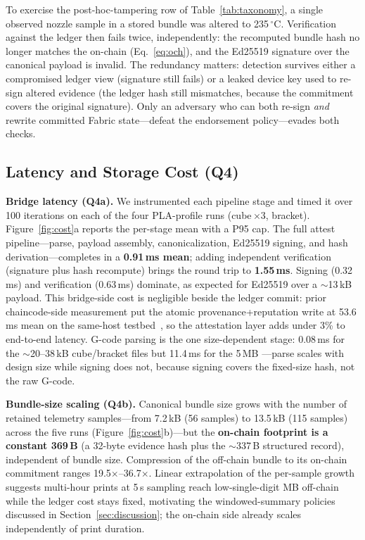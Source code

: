 To exercise the post-hoc-tampering row of Table~\ref{tab:taxonomy}, a
single observed nozzle sample in a stored bundle was altered to
235\,$^{\circ}$C.  Verification against the ledger then fails twice,
independently: the recomputed bundle hash no longer matches the on-chain
 (Eq.~\eqref{eq:och}), and the Ed25519 signature
over the canonical payload is invalid.  The redundancy matters: detection
survives either a compromised ledger view (signature still fails) or a
leaked device key used to re-sign altered evidence (the ledger hash still
mismatches, because the commitment covers the original signature).  Only
an adversary who can both re-sign \emph{and} rewrite committed Fabric
state---defeat the endorsement policy---evades both checks.

\subsection{Latency and Storage Cost (Q4)}
\label{sec:eval_cost}

\textbf{Bridge latency (Q4a).}  We instrumented each pipeline stage and
timed it over 100 iterations on each of the four PLA-profile runs
(cube\,$\times$3, bracket).  Figure~\ref{fig:cost}a reports the per-stage
mean with a P95 cap.  The full attest pipeline---parse, payload assembly,
canonicalization, Ed25519 signing, and hash derivation---completes in a
\textbf{0.91\,ms mean}; adding independent verification (signature plus
hash recompute) brings the round trip to \textbf{1.55\,ms}.  Signing
(0.32\,ms) and verification (0.63\,ms) dominate, as expected for Ed25519
over a $\sim$13\,kB payload.  This bridge-side cost is negligible beside
the ledger commit: prior chaincode-side measurement put the atomic
provenance+reputation write at 53.6\,ms mean on the same-host
testbed~\cite{anonymous2026unified}, so the attestation layer adds under
3\% to end-to-end latency.  G-code parsing is the one size-dependent stage:
0.08\,ms for the $\sim$20--38\,kB cube/bracket files but 11.4\,ms for the
5\,MB ---parse scales with design size while signing does
not, because signing covers the fixed-size hash, not the raw G-code.

\textbf{Bundle-size scaling (Q4b).}  Canonical bundle size grows with the
number of retained telemetry samples---from 7.2\,kB (56 samples) to
13.5\,kB (115 samples) across the five runs (Figure~\ref{fig:cost}b)---but
the \textbf{on-chain footprint is a constant 369\,B} (a 32-byte evidence
hash plus the $\sim$337\,B structured record), independent of bundle size.
Compression of the off-chain bundle to its on-chain commitment ranges
19.5$\times$--36.7$\times$.  Linear extrapolation of the per-sample growth
suggests multi-hour prints at 5\,s sampling reach low-single-digit MB
off-chain while the ledger cost stays fixed, motivating the
windowed-summary policies discussed in Section~\ref{sec:discussion}; the
on-chain side already scales independently of print duration.

